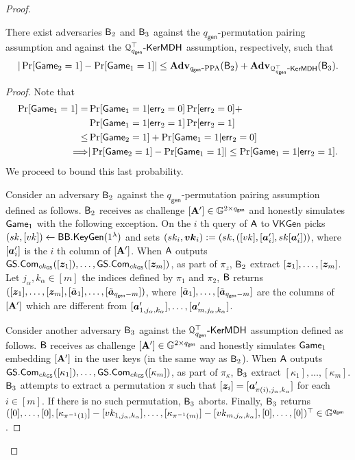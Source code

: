 \begin{proof}
\begin{lemma} There exist adversaries $\mathsf{B}_2$ and $\mathsf{B}_3$ against the ${q_\mathsf{gen}}$-permutation pairing assumption and against the $\mathcal{Q}^\top_{{q_\mathsf{gen}}}\mbox{-}\mathsf{KerMDH}$ assumption, respectively, such that
$$
|\Pr[\mathsf{Game}_2=1]-\Pr[\mathsf{Game}_1=1]|\leq \mathbf{Adv}_{{q_\mathsf{gen}}\mbox{-}\mathrm{PPA}}(\mathsf{B}_2)+\mathbf{Adv}_{\mathcal{Q}^\top_{{q_\mathsf{gen}}}\mbox{-}\mathsf{KerMDH}}(\mathsf{B}_3).
$$
\end{lemma}
\begin{proof}
Note that
\begin{align*}
\Pr[\mathsf{Game}_1=1]
 = &\Pr[\mathsf{Game}_1=1|\mathsf{err}_2=0]\Pr[\mathsf{err}_2=0]+\\
&\Pr[\mathsf{Game}_1=1|\mathsf{err}_2=1]\Pr[\mathsf{err}_2=1]\\
 \leq& \Pr[\mathsf{Game}_2=1] + \Pr[\mathsf{Game}_1=1|\mathsf{err}_2=0]\\
\Longrightarrow  &|\Pr[\mathsf{Game}_2=1]-\Pr[\mathsf{Game}_1=1]|\leq \Pr[\mathsf{Game}_1=1|\mathsf{err}_2=1].
\end{align*}
We proceed to bound this last probability.

Consider an adversary $\mathsf{B}_2$ against the ${q_\mathsf{gen}}$-permutation pairing assumption defined as follows. $\mathsf{B}_2$ receives as challenge $[\mathbf{{A}}']\in\mathbb{G}^{2\times {q_\mathsf{gen}}}$ and honestly simulates $\mathsf{Game}_1$ with the following exception. On the $i$ th query of $\mathsf{A}$ to $\mathsf{VKGen}$ picks $(sk,[vk])\gets\mathsf{BB}.\mathsf{KeyGen}(1^\lambda)$ and sets $(sk_i,{\boldsymbol{vk}}_i):=(sk,([vk],[{\boldsymbol{a}}'_i],sk[{\boldsymbol{a}}'_i]))$, where $[{\boldsymbol{a}}'_i]$ is the $i$ th column of $[\mathbf{{A}}']$. When $\mathsf{A}$ outputs ${\mathsf{GS}}.\mathsf{Com}_{ck_{\mathsf{GS}}}([{\boldsymbol{z}}_1]),\ldots,\allowbreak{\mathsf{GS}}.\mathsf{Com}_{ck_{\mathsf{GS}}}([{\boldsymbol{z}}_m])$, as part of $\pi_z$, $\mathsf{B}_2$ extract $[{\boldsymbol{z}}_1],\ldots,[{\boldsymbol{z}}_m]$.  Let $j_\alpha,k_\alpha\in[m]$ the indices defined by $\pi_1$ and $\pi_2$, $\mathsf{B}$ returns $([{\boldsymbol{z}}_1],\ldots,[{\boldsymbol{z}}_m],[\tilde{{\boldsymbol{a}}}_1],\ldots,[\tilde{{\boldsymbol{a}}}_{{q_\mathsf{gen}}-m}])$, where $[\tilde{{\boldsymbol{a}}}_1],\ldots,[\tilde{{\boldsymbol{a}}}_{{q_\mathsf{gen}}-m}]$ are the columns of $[\mathbf{{A}}']$ which are different from $[{\boldsymbol{a}}'_{1,j_\alpha,k_\alpha}],\ldots,\allowbreak[{\boldsymbol{a}}'_{m,j_\alpha,k_\alpha}]$.

Consider another adversary $\mathsf{B}_3$ against the $\mathcal{Q}_{q_\mathsf{gen}}^\top\mbox{-}\mathsf{KerMDH}$ assumption defined as follows. $\mathsf{B}$ receives as challenge $[\mathbf{{A}}']\in\mathbb{G}^{2\times {q_\mathsf{gen}}}$ and honestly simulates $\mathsf{Game}_1$ embedding $[\mathbf{{A}}']$ in the user keys (in the same way as $\mathsf{B}_2$). When $\mathsf{A}$ outputs ${\mathsf{GS}}.\mathsf{Com}_{ck_{\mathsf{GS}}}([\kappa_1]),\ldots,\allowbreak{\mathsf{GS}}.\mathsf{Com}_{ck_{\mathsf{GS}}}([\kappa_m])$, as part of $\pi_\kappa$, $\mathsf{B}_3$ extract $[\kappa_1],\ldots,[\kappa_m]$. $\mathsf{B}_3$ attempts to extract a permutation $\pi$ such that  $[{\boldsymbol{z}}_i]=[{\boldsymbol{a}}'_{\pi(i),j_\alpha,k_\alpha}]$ for each $i\in[m]$. If there is no such permutation, $\mathsf{B}_3$ aborts. Finally, $\mathsf{B}_3$ returns $([0],\ldots,[0],\allowbreak [\kappa_{\pi^{-1}(1)}]-[vk_{1,j_\alpha,k_\alpha}],\ldots,[\kappa_{\pi^{-1}(m)}]-[vk_{m,j_\alpha,k_\alpha}],[0],\ldots,[0])^\top\in\mathbb{G}^{{q_\mathsf{gen}}}$.


\end{proof}
\end{proof}
